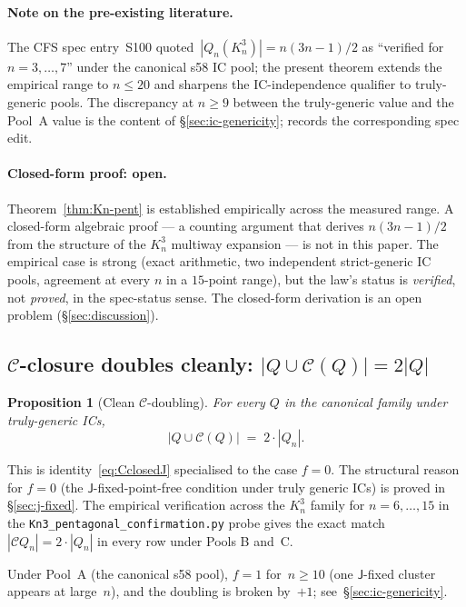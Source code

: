 \documentclass[12pt,a4paper]{article}
\newtheorem{proposition}[theorem]{Proposition}
\theoremstyle{definition}
\theoremstyle{remark}
\newcommand{\Kn}{K_n^3}
\newcommand{\Qn}{Q_n}
\newcommand{\Ccls}{\mathcal{C}}             %
\newcommand{\Jconj}{\mathsf{J}}             %
\begin{document}
\paragraph{Note on the pre-existing literature.}
The CFS spec entry~S100 quoted~$|\Qn(\Kn)| = n(3n{-}1)/2$ as
``verified for $n = 3, \dots, 7$'' under the canonical s58 IC pool;
the present theorem extends the empirical range to $n \le 20$ and
sharpens the IC-independence qualifier to truly-generic pools. The
discrepancy at $n \ge 9$ between the truly-generic value and the
Pool~A value is the content of \S\ref{sec:ic-genericity};
\cite{closure-v5-audit-threebug} records the corresponding spec edit.

\paragraph{Closed-form proof: open.}
Theorem~\ref{thm:Kn-pent} is established empirically across the
measured range. A closed-form algebraic proof --- a counting argument
that derives $n(3n{-}1)/2$ from the structure of the $\Kn$ multiway
expansion --- is not in this paper. The empirical case is strong
(exact arithmetic, two independent strict-generic IC pools, agreement
at every $n$ in a $15$-point range), but the law's status is
\emph{verified}, not \emph{proved}, in the spec-status sense.
The closed-form derivation is an open problem (\S\ref{sec:discussion}).

\subsection{$\Ccls$-closure doubles cleanly: $|Q \cup \Ccls(Q)| = 2|Q|$}
\label{sec:law-Cdouble}

\begin{proposition}[Clean $\Ccls$-doubling]\label{prop:C-double}
For every $Q$ in the canonical family under truly-generic ICs,
\[
|Q \cup \Ccls(Q)| \;=\; 2 \cdot |\Qn|.
\]
\end{proposition}

This is identity~\eqref{eq:CclosedJ} specialised to the case
$f = 0$. The structural reason for $f = 0$ (the
$\Jconj$-fixed-point-free condition under truly generic ICs) is
proved in \S\ref{sec:j-fixed}. The empirical verification across
the $\Kn$ family for $n = 6, \dots, 15$ in the
\texttt{Kn3\_pentagonal\_confirmation.py} probe gives the exact
match $|\Ccls\Qn| = 2 \cdot |\Qn|$ in every row under Pools B and~C.

Under Pool~A (the canonical s58 pool), $f = 1$ for~$n \ge 10$ (one
$\Jconj$-fixed cluster appears at large~$n$), and the doubling is
broken by~$+1$; see~\S\ref{sec:ic-genericity}.
\end{document}
